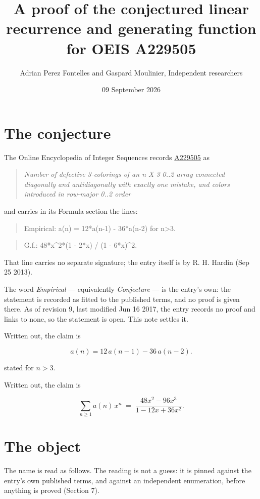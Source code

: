 \documentclass[11pt]{article}
\title{A proof of the conjectured linear recurrence and generating function for OEIS A229505}
\author{Adrian Perez Fontelles and Gaspard Moulinier, Independent researchers}
\date{09 September 2026}
\theoremstyle{definition}
\begin{document}
\maketitle
\section{The conjecture}

The Online Encyclopedia of Integer Sequences records \href{https://oeis.org/A229505}{A229505} as

\begin{quote}\itshape Number of defective 3-colorings of an n X 3 0..2 array connected diagonally and antidiagonally with exactly one mistake, and colors introduced in row-major 0..2 order\end{quote}

and carries in its Formula section the lines:

\begin{quote}\ttfamily Empirical: a(n) = 12*a(n-1) - 36*a(n-2) for n>3.\end{quote}

\begin{quote}\ttfamily G.f.: 48*x\textasciicircum{}2*(1 - 2*x) / (1 - 6*x)\textasciicircum{}2.\end{quote}

That line carries no separate signature; the entry itself is by R. H. Hardin (Sep 25 2013).

The word {\itshape Empirical} --- equivalently {\itshape Conjecture} --- is the entry's own: the statement is recorded as fitted to the published terms, and no proof is given there. As of revision 9, last modified Jun 16 2017, the entry records no proof and links to none, so the statement is open. This note settles it.

Written out, the claim is

\[a(n) = 12\,a(n-1) - 36\,a(n-2).\]

stated for $n > 3$.

Written out, the claim is

\[\sum_{n \ge 1} a(n)\,x^n \;=\; \frac{48x^{2} - 96x^{3}}{1 - 12x + 36x^{2}}.\]

\section{The object}

The name is read as follows. The reading is not a guess: it is pinned against the entry's own published terms, and against an independent enumeration, before anything is proved (Section 7).
\end{document}
